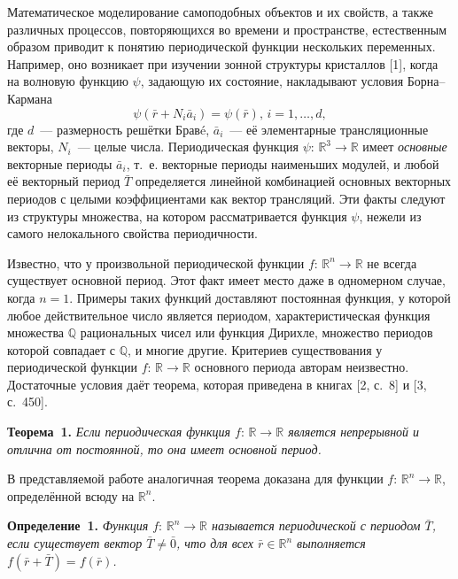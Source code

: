 




\vzmscaption

Математическое моделирование самоподобных объектов и их свойств, а также различных процессов, повторяющихся во времени и пространстве, естественным образом приводит к понятию  периодической функции нескольких переменных. Например, оно возникает при изучении  зонной структуры кристаллов [1], когда на волновую функцию
$\psi$, задающую их состояние, накладывают условия Борна--Кармана
$$
\psi(\bar{r}+N_{i}\bar{a}_{i})=\psi(\bar{r}),\,i=1,\ldots,d,
$$
где $d$~--- размерность решётки Брав{\'e},
$\bar{a}_{i}$~--- её элементарные трансляционные векторы,
$N_{i}$~--- целые числа.
Периодическая функция $\psi:\,{\mathbb R}^{3}\to{\mathbb R}$ имеет {\it основные} векторные периоды $\bar{a}_{i}$,
т.~е. векторные периоды наименьших модулей,
и любой её векторный период $\bar{T}$ определяется линейной комбинацией основных векторных периодов с целыми коэффициентами
как вектор трансляций.
Эти факты следуют из структуры множества, на котором рассматривается функция $\psi$,
нежели из самого нелокального свойства периодичности.

Известно, что у произвольной периодической функции $f:\,{\mathbb R}^{n}\to{\mathbb R}$ не всегда существует основной период. Этот факт имеет место даже в одномерном случае, когда $n=1$. Примеры таких функций  доставляют  постоянная функция, у которой любое действительное число является периодом, характеристическая функция множества ${\mathbb Q}$ рациональных чисел или функция Дирихле, множество периодов которой совпадает с ${\mathbb Q}$, и многие другие. Критериев существования у периодической функции $f:\,{\mathbb R}\to {\mathbb R}$ основного периода авторам неизвестно. Достаточные условия даёт теорема, которая приведена в книгах [2, с.~8] и [3, с.~450].

\textbf{Теорема~1.} {\it Если периодическая функция $f:\,{\mathbb R}\to {\mathbb R}$ является непрерывной и отлична от постоянной, то она имеет основной период.}

В представляемой работе аналогичная теорема доказана для функции  $f:\,{\mathbb R}^{n}\to {\mathbb R}$, определённой всюду на ${\mathbb R}^{n}$.

\textbf{Определение~1.} {\it Функция $f:\,{\mathbb R}^{n}\to {\mathbb R}$ называется периодической с периодом $\bar{T}$, если существует вектор $\bar{T}\neq\bar{0}$, что для всех $\bar{r}\in{\mathbb R}^{n}$ выполняется $f(\bar{r}+\bar{T})=f(\bar{r})$.}

